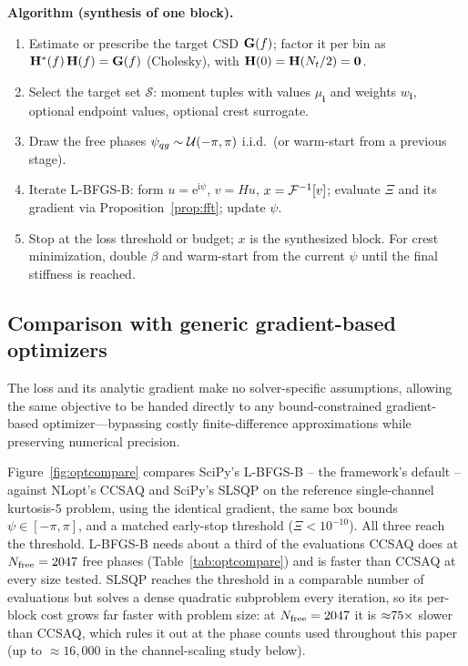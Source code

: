 \documentclass[10pt,a4paper]{article}
\numberwithin{equation}{section}
\DeclarePairedDelimiter\block{[}{]}
\DeclarePairedDelimiter\mat{(}{)}
\newcommand{\m}[1]{\mathrm{#1}}
\begin{document}
\textbf{Algorithm (synthesis of one block).}
\begin{enumerate}
\item Estimate or prescribe the target CSD $\mathbf{G}\mat{f}$; factor it per bin as $\mathbf{H}^*\mat{f}\,\mathbf{H}\mat{f} = \mathbf{G}\mat{f}$ (Cholesky), with $\mathbf{H}\mat{0} = \mathbf{H}\mat{N_t/2} = \mathbf{0}$.
\item Select the target set $\mathcal{S}$: moment tuples with values $\mu_\mathbf{i}$ and weights $w_\mathbf{i}$, optional endpoint values, optional crest surrogate.
\item Draw the free phases $\psi_{q g} \sim \mathcal{U}\mat{-\pi, \pi}$ i.i.d.\ (or warm-start from a previous stage).
\item Iterate L-BFGS-B: form $u = \m{e}^{\m{i}\psi}$, $v = H u$, $x = \mathcal{F}^{-1}\block{v}$; evaluate $\Xi$ and its gradient via Proposition~\ref{prop:fft}; update $\psi$.
\item Stop at the loss threshold or budget; $x$ is the synthesized block. For crest minimization, double $\beta$ and warm-start from the current $\psi$ until the final stiffness is reached.
\end{enumerate}

\subsection*{Comparison with generic gradient-based optimizers}
The loss and its analytic gradient make no solver-specific assumptions, allowing the same objective to be handed directly to any bound-constrained gradient-based optimizer—bypassing costly finite-difference approximations while preserving numerical precision.

Figure~\ref{fig:optcompare} compares SciPy's L-BFGS-B -- the framework's default -- against NLopt's CCSAQ and SciPy's SLSQP on the reference single-channel kurtosis-$5$ problem, using the identical gradient, the same box bounds $\psi\in[-\pi,\pi]$, and a matched early-stop threshold ($\Xi < 10^{-10}$). All three reach the threshold. L-BFGS-B needs about a third of the evaluations CCSAQ does at $N_{\rm free}=2047$ free phases (Table~\ref{tab:optcompare}) and is faster than CCSAQ at every size tested. SLSQP reaches the threshold in a comparable number of evaluations but solves a dense quadratic subproblem every iteration, so its per-block cost grows far faster with problem size: at $N_{\rm free}=2047$ it is ${\approx}75\times$ slower than CCSAQ, which rules it out at the phase counts used throughout this paper (up to ${\approx}16{,}000$ in the channel-scaling study below).
\end{document}
